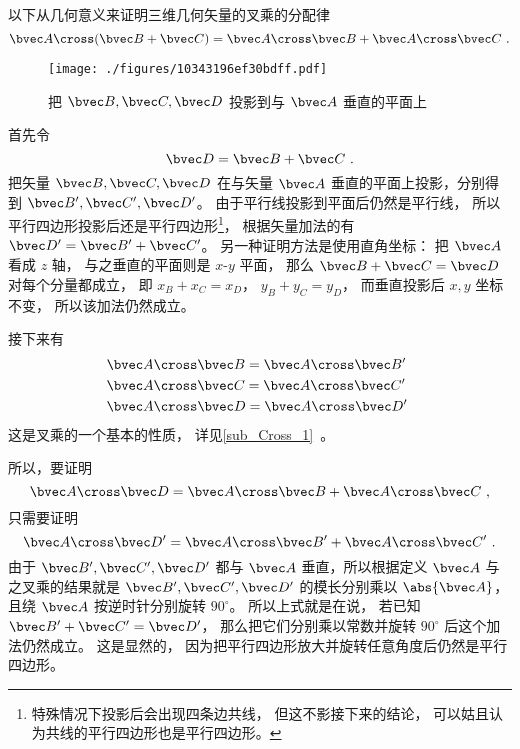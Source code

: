 
以下从几何意义来证明三维几何矢量的叉乘的分配律
\begin{equation}
\bvec A \cross (\bvec B + \bvec C) = \bvec A \cross \bvec B + \bvec A \cross \bvec C~.
\end{equation}

\begin{figure}[ht]
\vskip-10pt
\centering
\texttt{[image: ./figures/10343196ef30bdff.pdf]}
\caption{把 $\bvec B,\bvec C,\bvec D$ 投影到与 $\bvec A$ 垂直的平面上}\label{fig_CrossP_1}
\end{figure}

首先令
\begin{equation}
\bvec D = \bvec B + \bvec C~.
\end{equation}
把矢量 $\bvec B,\bvec C,\bvec D$ 在与矢量 $\bvec A$ 垂直的平面上投影，分别得到 $\bvec B',\bvec C',\bvec D'$。 由于平行线投影到平面后仍然是平行线， 所以平行四边形投影后还是平行四边形\footnote{特殊情况下投影后会出现四条边共线， 但这不影接下来的结论， 可以姑且认为共线的平行四边形也是平行四边形。}， 根据矢量加法的有 $\bvec D'=\bvec B'+\bvec C'$。 另一种证明方法是使用直角坐标： 把 $\bvec A$ 看成 $z$ 轴， 与之垂直的平面则是 $x$-$y$ 平面， 那么 $\bvec B + \bvec C = \bvec D$ 对每个分量都成立， 即 $x_B + x_C = x_D$， $y_B + y_C = y_D$， 而垂直投影后 $x,y$ 坐标不变， 所以该加法仍然成立。

接下来有
\begin{equation}\label{eq_CrossP_2}
\begin{aligned}
&\bvec A \cross \bvec B = \bvec A \cross \bvec B'\\
&\bvec A \cross \bvec C = \bvec A \cross \bvec C'\\
&\bvec A \cross \bvec D = \bvec A \cross \bvec D'
\end{aligned}~
\end{equation} 
这是叉乘的一个基本的性质， 详见\autoref{sub_Cross_1}~。

所以，要证明
\begin{equation}\label{eq_CrossP_1}
\bvec A \cross \bvec D = \bvec A \cross \bvec B + \bvec A \cross \bvec C~,
\end{equation}
只需要证明
\begin{equation}
\bvec A \cross \bvec D' = \bvec A \cross \bvec B' + \bvec A \cross \bvec C'~.
\end{equation}
由于 $\bvec B', \bvec C', \bvec D'$ 都与 $\bvec A$ 垂直，所以根据定义 $\bvec A$ 与之叉乘的结果就是 $\bvec B', \bvec C', \bvec D'$ 的模长分别乘以 $\abs {\bvec A}$， 且绕 $\bvec A$ 按逆时针分别旋转 $90^\circ$。 所以上式就是在说， 若已知 $\bvec B' + \bvec C' = \bvec D'$， 那么把它们分别乘以常数并旋转 $90^\circ$ 后这个加法仍然成立。 这是显然的， 因为把平行四边形放大并旋转任意角度后仍然是平行四边形。

